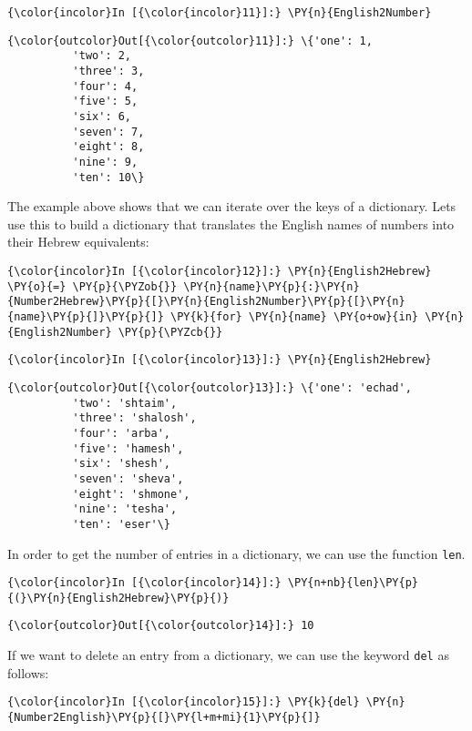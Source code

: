 \begin{Verbatim}[commandchars=\\\{\}]
{\color{incolor}In [{\color{incolor}11}]:} \PY{n}{English2Number}
\end{Verbatim}

\begin{Verbatim}[commandchars=\\\{\}]
{\color{outcolor}Out[{\color{outcolor}11}]:} \{'one': 1,
          'two': 2,
          'three': 3,
          'four': 4,
          'five': 5,
          'six': 6,
          'seven': 7,
          'eight': 8,
          'nine': 9,
          'ten': 10\}
\end{Verbatim}
The example above shows that we can iterate over the keys of a
dictionary. Lets use this to build a dictionary that translates the
English names of numbers into their Hebrew equivalents:
\begin{Verbatim}[commandchars=\\\{\}]
{\color{incolor}In [{\color{incolor}12}]:} \PY{n}{English2Hebrew} \PY{o}{=} \PY{p}{\PYZob{}} \PY{n}{name}\PY{p}{:}\PY{n}{Number2Hebrew}\PY{p}{[}\PY{n}{English2Number}\PY{p}{[}\PY{n}{name}\PY{p}{]}\PY{p}{]} \PY{k}{for} \PY{n}{name} \PY{o+ow}{in} \PY{n}{English2Number} \PY{p}{\PYZcb{}}
\end{Verbatim}

\begin{Verbatim}[commandchars=\\\{\}]
{\color{incolor}In [{\color{incolor}13}]:} \PY{n}{English2Hebrew}
\end{Verbatim}

\begin{Verbatim}[commandchars=\\\{\}]
{\color{outcolor}Out[{\color{outcolor}13}]:} \{'one': 'echad',
          'two': 'shtaim',
          'three': 'shalosh',
          'four': 'arba',
          'five': 'hamesh',
          'six': 'shesh',
          'seven': 'sheva',
          'eight': 'shmone',
          'nine': 'tesha',
          'ten': 'eser'\}
\end{Verbatim}
In order to get the number of entries in a dictionary, we can use the
function \texttt{len}.
\begin{Verbatim}[commandchars=\\\{\}]
{\color{incolor}In [{\color{incolor}14}]:} \PY{n+nb}{len}\PY{p}{(}\PY{n}{English2Hebrew}\PY{p}{)}
\end{Verbatim}

\begin{Verbatim}[commandchars=\\\{\}]
{\color{outcolor}Out[{\color{outcolor}14}]:} 10
\end{Verbatim}
If we want to delete an entry from a dictionary, we can use the keyword
\texttt{del} as follows:
\begin{Verbatim}[commandchars=\\\{\}]
{\color{incolor}In [{\color{incolor}15}]:} \PY{k}{del} \PY{n}{Number2English}\PY{p}{[}\PY{l+m+mi}{1}\PY{p}{]}
\end{Verbatim}

